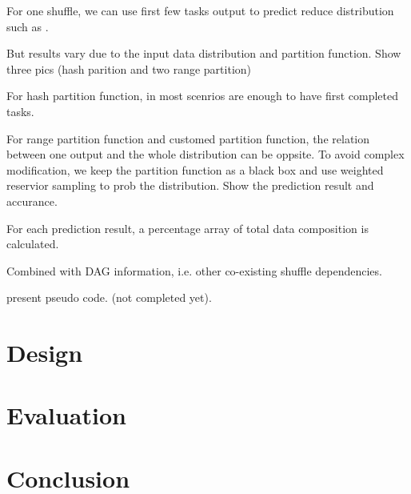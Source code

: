 \documentclass[10pt,twocolumn]{article}
\begin{document}
For one shuffle, we can use first few tasks output to predict reduce distribution such as \cite{ishuffle}. 

But results vary due to the input data distribution and partition function. Show three pics (hash parition and two range partition)

For hash partition function, in most scenrios are enough to have first completed tasks.

For range partition function and customed partition function, the relation between one output and the whole distribution can be oppsite.
To avoid complex modification, we keep the partition function as a black box and use weighted reservior sampling to prob the distribution.
Show the prediction result and accurance.

For each prediction result, a percentage array of total data composition is calculated.

Combined with DAG information, i.e. other co-existing shuffle dependencies.

present pseudo code. (not completed yet).

\section{Design}
\section{Evaluation}

\section{Conclusion}





\end{document}
